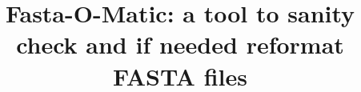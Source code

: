 \documentclass{bmcart}
\begin{document}
\begin{frontmatter}

\begin{fmbox}


\title{Fasta-O-Matic: a tool to sanity check and if needed reformat FASTA files}


\author[
   addressref={aff1},                   %
   email={sheltonj@ksu.edu}   %
]{ }
\author[
   addressref={aff1},
      corref={aff1},                       %
   email={sjbrown@ksu.edu} %
]{ }


\address[id=aff1]{%
  , %
  ,                              %
}
\address[id=aff2]{%
  , %
  ,                              %
}




\end{fmbox}
\end{frontmatter}
\end{document}
